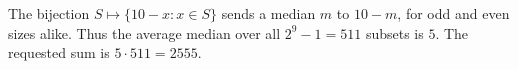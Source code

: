 The bijection $S\mapsto\{10-x:x\in S\}$ sends a median $m$ to $10-m$, for odd and even sizes alike. Thus the average median over all $2^9-1=511$ subsets is $5$. The requested sum is $\boxed{5\cdot511=2555}$.
